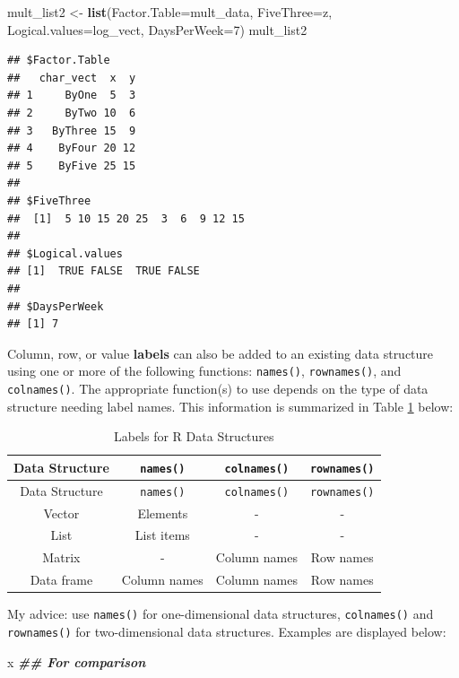 \documentclass[
]{book}
\newenvironment{Shaded}{\begin{snugshade}}{\end{snugshade}}
\newcommand{\AttributeTok}[1]{\textcolor[rgb]{0.13,0.29,0.53}{#1}}
\newcommand{\DecValTok}[1]{\textcolor[rgb]{0.00,0.00,0.81}{#1}}
\newcommand{\DocumentationTok}[1]{\textcolor[rgb]{0.56,0.35,0.01}{\textbf{\textit{#1}}}}
\newcommand{\FunctionTok}[1]{\textcolor[rgb]{0.13,0.29,0.53}{\textbf{#1}}}
\newcommand{\NormalTok}[1]{#1}
\newcommand{\OtherTok}[1]{\textcolor[rgb]{0.56,0.35,0.01}{#1}}
\theoremstyle{definition}
\theoremstyle{definition}
\theoremstyle{definition}
\theoremstyle{definition}
\theoremstyle{remark}
\begin{document}
\begin{Shaded}
\begin{Highlighting}[]
\NormalTok{mult\_list2 }\OtherTok{\textless{}{-}} \FunctionTok{list}\NormalTok{(}\AttributeTok{Factor.Table=}\NormalTok{mult\_data, }\AttributeTok{FiveThree=}\NormalTok{z, }
                   \AttributeTok{Logical.values=}\NormalTok{log\_vect, }\AttributeTok{DaysPerWeek=}\DecValTok{7}\NormalTok{)}
\NormalTok{mult\_list2}
\end{Highlighting}
\end{Shaded}

\begin{verbatim}
## $Factor.Table
##   char_vect  x  y
## 1     ByOne  5  3
## 2     ByTwo 10  6
## 3   ByThree 15  9
## 4    ByFour 20 12
## 5    ByFive 25 15
## 
## $FiveThree
##  [1]  5 10 15 20 25  3  6  9 12 15
## 
## $Logical.values
## [1]  TRUE FALSE  TRUE FALSE
## 
## $DaysPerWeek
## [1] 7
\end{verbatim}

Column, row, or value \textbf{labels} can also be added to an existing data structure using one or more of the following functions: \texttt{names()}, \texttt{rownames()}, and \texttt{colnames()}. The appropriate function(s) to use depends on the type of data structure needing label names. This information is summarized in Table \ref{tab:labels} below:

\begin{longtable}[]{@{}cccc@{}}
\caption{\label{tab:labels} Labels for R Data Structures}\tabularnewline
\toprule\noalign{}
Data Structure & \texttt{names()} & \texttt{colnames()} & \texttt{rownames()} \\
\midrule\noalign{}
\endfirsthead
\toprule\noalign{}
Data Structure & \texttt{names()} & \texttt{colnames()} & \texttt{rownames()} \\
\midrule\noalign{}
\endhead
\bottomrule\noalign{}
\endlastfoot
Vector & Elements & - & - \\
List & List items & - & - \\
Matrix & - & Column names & Row names \\
Data frame & Column names & Column names & Row names \\
\end{longtable}

My advice: use \texttt{names()} for one-dimensional data structures, \texttt{colnames()} and \texttt{rownames()} for two-dimensional data structures. Examples are displayed below:

\begin{Shaded}
\begin{Highlighting}[]
\NormalTok{x }\DocumentationTok{\#\# For comparison}
\end{Highlighting}
\end{Shaded}
\end{document}
